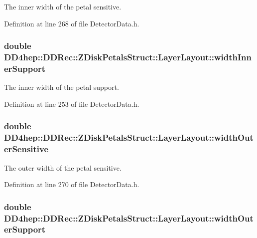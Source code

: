 The inner width of the petal sensitive. 

Definition at line 268 of file DetectorData.h.\hypertarget{struct_d_d4hep_1_1_d_d_rec_1_1_z_disk_petals_struct_1_1_layer_layout_ad2a842725740bd0d2e2bc412f9e54f02}{
\subsubsection[{widthInnerSupport}]{\setlength{\rightskip}{0pt plus 5cm}double {\bf DD4hep::DDRec::ZDiskPetalsStruct::LayerLayout::widthInnerSupport}}}
\label{struct_d_d4hep_1_1_d_d_rec_1_1_z_disk_petals_struct_1_1_layer_layout_ad2a842725740bd0d2e2bc412f9e54f02}


The inner width of the petal support. 

Definition at line 253 of file DetectorData.h.\hypertarget{struct_d_d4hep_1_1_d_d_rec_1_1_z_disk_petals_struct_1_1_layer_layout_a091abb2a08a38938db892456c7bdc21e}{
\subsubsection[{widthOuterSensitive}]{\setlength{\rightskip}{0pt plus 5cm}double {\bf DD4hep::DDRec::ZDiskPetalsStruct::LayerLayout::widthOuterSensitive}}}
\label{struct_d_d4hep_1_1_d_d_rec_1_1_z_disk_petals_struct_1_1_layer_layout_a091abb2a08a38938db892456c7bdc21e}


The outer width of the petal sensitive. 

Definition at line 270 of file DetectorData.h.\hypertarget{struct_d_d4hep_1_1_d_d_rec_1_1_z_disk_petals_struct_1_1_layer_layout_ad5542ca1bb7f8141957104d4415fbb61}{
\subsubsection[{widthOuterSupport}]{\setlength{\rightskip}{0pt plus 5cm}double {\bf DD4hep::DDRec::ZDiskPetalsStruct::LayerLayout::widthOuterSupport}}}
\label{struct_d_d4hep_1_1_d_d_rec_1_1_z_disk_petals_struct_1_1_layer_layout_ad5542ca1bb7f8141957104d4415fbb61}


